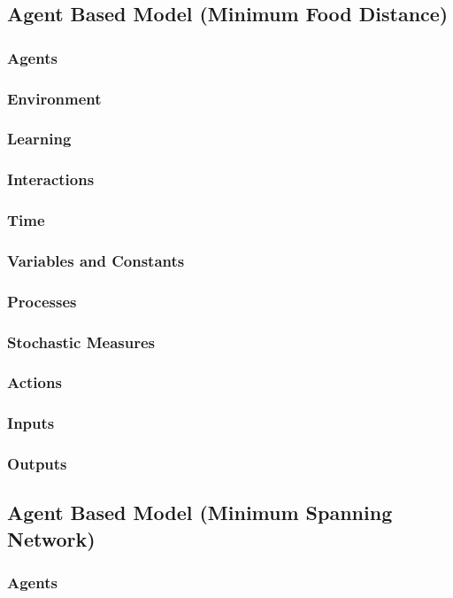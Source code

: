 \documentclass[a4paper, 10pt]{article}
\begin{document}
\subsection{Agent Based Model (Minimum Food Distance)}
\subsubsection*{Agents}
\subsubsection*{Environment}
\subsubsection*{Learning}
\subsubsection*{Interactions}
\subsubsection*{Time}
\subsubsection*{Variables and Constants}
\subsubsection*{Processes}
\subsubsection*{Stochastic Measures}
\subsubsection*{Actions}
\subsubsection*{Inputs}
\subsubsection*{Outputs}

\subsection{Agent Based Model (Minimum Spanning Network)}
\subsubsection* {Agents}
\end{document}
